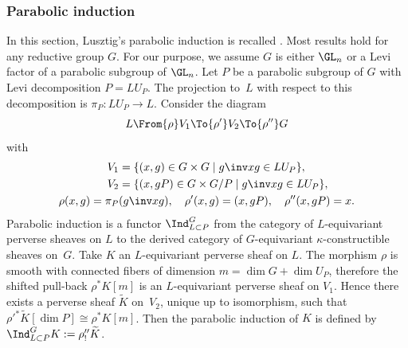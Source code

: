 \subsubsection{Parabolic induction}
In this section, Lusztig's parabolic induction is recalled \cite{Lusztig1984,lusztig_character_sheaves,Lusztig1986}. Most results hold for any reductive group $G$. For our purpose, we assume $G$ is either $\GL_n$ or a Levi factor of a parabolic subgroup of $\GL_n$. Let $P$ be a parabolic subgroup of $G$ with Levi decomposition $P=L U_P$. The projection to~$L$ with respect to this decomposition is $\pi_{P}: L U_P\to L$. Consider the diagram
\begin{equation}\label{parabolic_induction_diagramm}
L \From{\rho} V_1 \To{\rho'} V_2 \To{\rho''} G
\end{equation}
with
\begin{align*}
V_1&=\lbrace (x,g)\in G\times G \mid g\inv x g \in L U_P\rbrace, \\
V_2 &=\lbrace (x, g P)\in G\times G/P \mid g\inv x g \in L U_P\rbrace,\\
\rho(x,g)=\pi_{P}&(g\inv x g), \quad \rho'(x,g)= (x,g P), \quad
\rho''(x,g P)=x.
\end{align*}
Parabolic induction is a functor $\Ind_{L\subset P}^{G}$ from the category of $L$-equivariant perverse sheaves on $L$ to the derived category of $G$-equivariant $\kappa$-constructible sheaves on~$G$.
Take $K$ an $L$-equivariant perverse sheaf on $L$. The morphism $\rho$ is smooth with connected fibers of dimension $m=\dim G +\dim U_P$, therefore the shifted pull-back $\rho^* K[m]$ is an $L$-equivariant perverse sheaf on $V_1$. Hence there exists a perverse sheaf $\widetilde{K}$ on~$V_2$, unique up to isomorphism, such that $\rho'^* \widetilde{K}[\dim P] \cong \rho^* K[m]$. Then the parabolic induction of $K$ is defined by $\Ind_{L \subset P}^{G} K := \rho''_{!}\widetilde{K}$.

